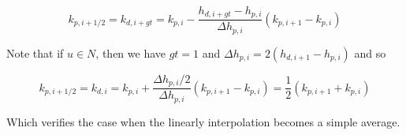 \documentclass[11pt]{article}
\begin{document}
\begin{equation}
  k_{p,i+1/2} = k_{d,i+gt} = k_{p,i} - \frac{h_{d,i+gt} - h_{p,i}}{\Delta h_{p,i}} (k_{p,i+1} - k_{p,i})
\end{equation}

Note that if $u \in N$, then we have $gt=1$ and $\Delta h_{p,i}= 2(h_{d,i+1} - h_{p,i})$ and so

\begin{equation}
  k_{p,i+1/2} = k_{d,i} = k_{p,i} + \frac{\Delta h_{p,i} / 2}{\Delta h_{p,i}} (k_{p,i+1} - k_{p,i}) = \frac{1}{2} (k_{p,i+1} + k_{p,i})
\end{equation}

Which verifies the case when the linearly interpolation becomes a simple average.
\end{document}
